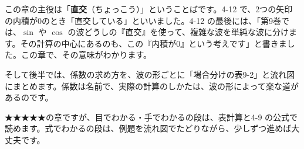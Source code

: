 この章の主役は「\textbf{直交}（ちょっこう）」ということばです。4-12 で、2つの矢印の内積が0のとき「直交している」といいました。4-12 の最後には、「第9巻では、$\sin$ や $\cos$ の波どうしの『直交』を使って、複雑な波を単純な波に分けます。その計算の中心にあるのも、この『内積が0』という考えです」と書きました。この章で、その意味がわかります。

そして後半では、係数の求め方を、波の形ごとに「場合分けの表9-2」と流れ図にまとめます。係数は名前で、実際の計算のしかたは、波の形によって楽な道があるのです。

\begin{omoidasou}
\end{omoidasou}

★★★★★の章ですが、目でわかる・手でわかるの段は、表計算と4-9 の公式で読めます。式でわかるの段は、例題を流れ図でたどりながら、少しずつ進めば大丈夫です。

